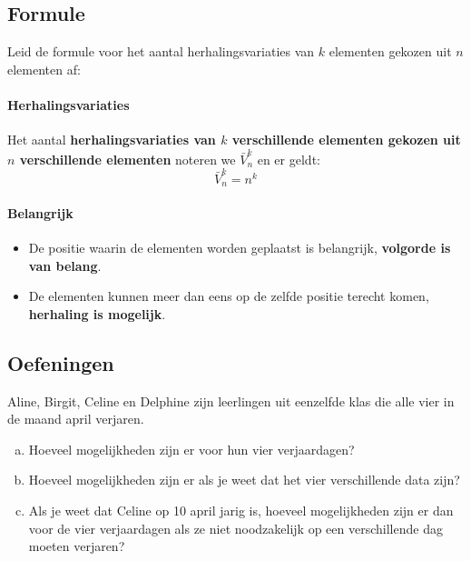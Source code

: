 \documentclass[12pt,twoside]{article}
\begin{document}
\begin{cursus}
\pagebreak
\subsection{Formule}

Leid de formule voor het aantal herhalingsvariaties van $k$ elementen gekozen uit $n$ elementen af:

\paragraph*{Herhalingsvariaties}
\begin{mdframed}
Het aantal {\bf herhalingsvariaties van $k$ verschillende elementen gekozen uit $n$ verschillende elementen} noteren we $\bar{V}^k_n$ en er geldt:
$$\bar{V}^k_n=n^k$$
\end{mdframed}

\paragraph*{Belangrijk}
\begin{itemize}
  \item De positie waarin de elementen worden geplaatst is belangrijk, {\bf volgorde is van belang}.
  \item De elementen kunnen meer dan eens op de zelfde positie terecht komen, {\bf herhaling is mogelijk}.
\end{itemize}

\pagebreak
\subsection{Oefeningen}

\end{cursus}

\begin{oefening}
Aline, Birgit, Celine en Delphine zijn leerlingen uit eenzelfde klas die alle vier in de maand april verjaren.
\begin{enumerate}[(a)]
  \item Hoeveel mogelijkheden zijn er voor hun vier verjaardagen?
  \item Hoeveel mogelijkheden zijn er als je weet dat het vier verschillende data zijn?
  \item Als je weet dat Celine op 10 april jarig is, hoeveel mogelijkheden zijn er dan voor de vier verjaardagen als ze niet noodzakelijk op een verschillende dag moeten verjaren?
\end{enumerate}
\end{oefening}
\end{document}
